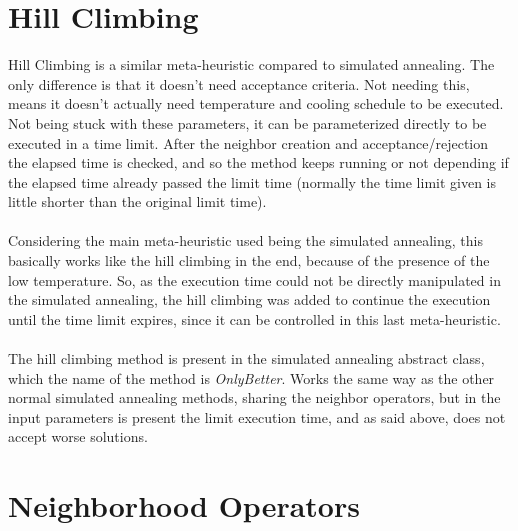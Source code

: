 \section{Hill Climbing}
\label{sec:HillClimbing}

Hill Climbing is a similar meta-heuristic compared to simulated annealing. The only difference is that it doesn't need acceptance criteria. Not needing this, means it doesn't actually need temperature and cooling schedule to be executed. Not being stuck with these parameters, it can be parameterized directly to be executed in a time limit. After the neighbor creation and acceptance/rejection the elapsed time is checked, and so the method keeps running or not depending if the elapsed time already passed the limit time (normally the time limit given is little shorter than the original limit time).\\
\\
Considering the main meta-heuristic used being the simulated annealing, this basically works like the hill climbing in the end, because of the presence of the low temperature. So, as the execution time could not be directly manipulated in the simulated annealing, the hill climbing was added to continue the execution until the time limit expires, since it can be controlled in this last meta-heuristic.\\
\\
The hill climbing method is present in the simulated annealing abstract class, which the name of the method is \textit{OnlyBetter}. Works the same way as the other normal simulated annealing methods, sharing the neighbor operators, but in the input parameters is present the limit execution time, and as said above, does not accept worse solutions.

\section{Neighborhood Operators}
\label{sec:NeighborhoodOperators}


